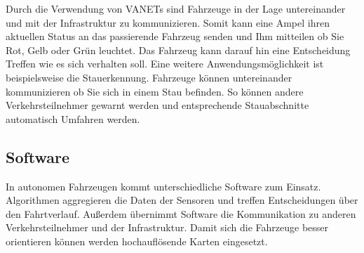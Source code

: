 Durch die Verwendung von VANETs sind Fahrzeuge in der Lage untereinander und mit der Infrastruktur zu kommunizieren. Somit kann eine Ampel ihren aktuellen Status an das passierende Fahrzeug senden und Ihm mitteilen ob Sie Rot, Gelb oder Grün leuchtet. Das Fahrzeug kann darauf hin eine Entscheidung Treffen wie es sich verhalten soll. Eine weitere Anwendungsmöglichkeit ist beispielsweise die Stauerkennung. Fahrzeuge können untereinander kommunizieren ob Sie sich in einem Stau befinden. So können andere Verkehrsteilnehmer gewarnt werden und entsprechende Stauabschnitte automatisch Umfahren werden.

\subsection{Software}

In autonomen Fahrzeugen kommt unterschiedliche Software zum Einsatz. Algorithmen aggregieren die Daten der Sensoren und treffen Entscheidungen über den Fahrtverlauf. Außerdem übernimmt Software die Kommunikation zu anderen Verkehrsteilnehmer und der Infrastruktur. Damit sich die Fahrzeuge besser orientieren können werden hochauflösende Karten eingesetzt.